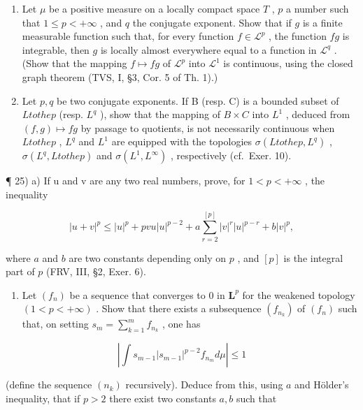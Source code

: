 \begin{enumerate}
\def\labelenumi{\arabic{enumi})}
\setcounter{enumi}{22}
\item
  Let \(\mu\) be a positive measure on a locally compact space \(T\) , \(p\) a number such that \(1 \leqslant p < +\infty\) , and \(q\) the conjugate exponent. Show that if \(g\) is a finite measurable function such that, for every function \(f \in \mathcal{L}^p\) , the function \(fg\) is integrable, then \(g\) is locally almost everywhere equal to a function in \(\mathcal{L}^q\) . (Show that the mapping \(f \mapsto fg\) of \(\mathcal{L}^p\) into \(\mathcal{L}^1\) is continuous, using the closed graph theorem (TVS, I, §3, Cor. 5 of Th. 1).)
\item
  Let \(p, q\) be two conjugate exponents. If B (resp. C) is a bounded subset of \(L to the p\) (resp. \(L^q\) ), show that the mapping of \(B \times C\) into \(L^1\) , deduced from \((f, g) \mapsto fg\) by passage to quotients, is not necessarily continuous when \(L to the p\) , \(L^q\) and \(L^1\) are equipped with the topologies \(\sigma(L to the p, L^q)\) , \(\sigma(L^q, L to the p)\) and \(\sigma(L^1, L^\infty)\) , respectively (cf.~Exer. 10).
\end{enumerate}

¶ 25) a) If u and v are any two real numbers, prove, for \(1 < p < +\infty\) , the inequality

\[
| u + v | ^ {p} \leqslant | u | ^ {p} + p v u | u | ^ {p - 2} + a \sum_ {r = 2} ^ {[ p ]} | v | ^ {r} | u | ^ {p - r} + b | v | ^ {p},
\]

where \(a\) and \(b\) are two constants depending only on \(p\) , and \([p]\) is the integral part of \(p\) (FRV, III, §2, Exer. 6).

\begin{enumerate}
\def\labelenumi{\alph{enumi})}
\setcounter{enumi}{1}
\tightlist
\item
  Let \((f_n)\) be a sequence that converges to 0 in \(\mathbf{L}^p\) for the weakened topology \((1 < p < +\infty)\) . Show that there exists a subsequence \((f_{n_k})\) of \((f_n)\) such that, on setting \(s_m = \sum_{k=1}^{m} f_{n_k}\) , one has
\end{enumerate}

\[
\left| \int s _ {m - 1} | s _ {m - 1} | ^ {p - 2} f _ {n _ {m}} d \mu \right| \leqslant 1
\]

(define the sequence \((n_k)\) recursively). Deduce from this, using \(a\) and Hölder's inequality, that if \(p > 2\) there exist two constants \(a, b\) such that

